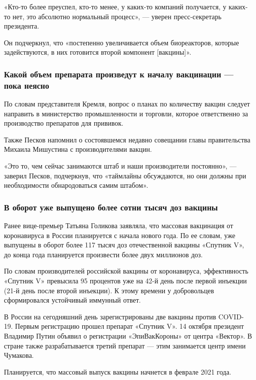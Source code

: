 «Кто-то более преуспел, кто-то менее, у каких-то компаний получается, у
каких-то нет, это абсолютно нормальный процесс», --- уверен пресс-секретарь
президента.

Он подчеркнул, что «постепенно увеличивается объем биореакторов, которые
задействуются, в них готовится второй компонент [вакцины]».

\subsubsection{Какой объем препарата произведут к началу вакцинации --- пока неясно}

По словам представителя Кремля, вопрос о планах по количеству вакцин следует
направить в министерство промышленности и торговли, которое ответственно за
производство препаратов для прививок.

Также Песков напомнил о состоявшемся недавно совещании главы правительства
Михаила Мишустина с производителями вакцин.

«Это то, чем сейчас занимаются штаб и наши производители постоянно», --- заверил
Песков, подчеркнув, что «таймлайны обсуждаются, но они должны при необходимости
обнародоваться самим штабом».

\subsubsection{В оборот уже выпущено более сотни тысяч доз вакцины}

Ранее вице-премьер Татьяна Голикова заявляла, что массовая вакцинация от
коронавируса в России планируется с начала нового года. По ее словам, уже
выпущены в оборот более 117 тысяч доз отечественной вакцины «Спутник V», до
конца года планируется произвести более двух миллионов доз.

По словам производителей российской вакцины от коронавируса, эффективность
«Спутник V» превысила 95 процентов уже на 42-й день после первой инъекции (21-й
день после второй инъекции). К этому времени у добровольцев сформировался
устойчивый иммунный ответ.

В России на сегодняшний день зарегистрированы две вакцины против COVID-19.
Первым регистрацию прошел препарат «Спутник V». 14 октября президент Владимир
Путин объявил о регистрации «ЭпиВакКороны» от центра «Вектор». В стране также
разрабатывается третий препарат --- этим занимается центр имени Чумакова.


Планируется, что массовый выпуск вакцины начнется в феврале 2021 года.


